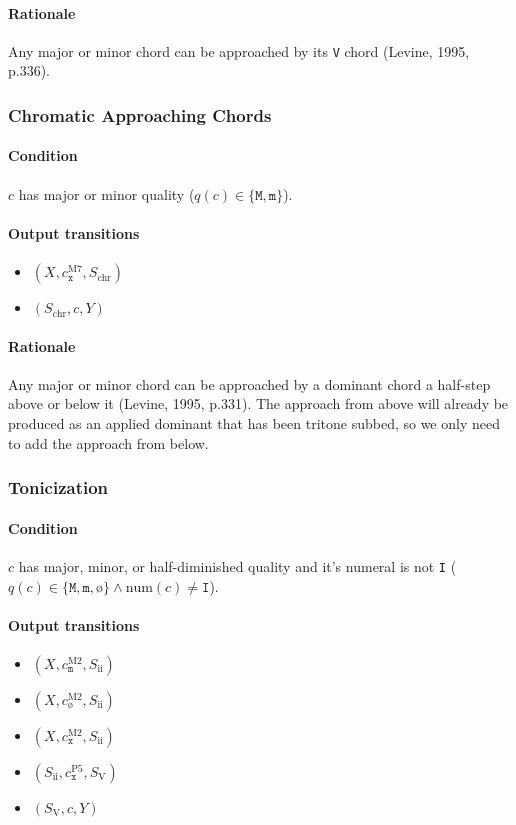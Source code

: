 \documentclass[]{article}
\begin{document}
\paragraph{Rationale} Any major or minor chord can be approached by its \texttt{V} chord (Levine, 1995, p.336).

\subsubsection{Chromatic Approaching Chords}
\paragraph{Condition} $c$ has major or minor quality ($q(c) \in \{\texttt{M}, \texttt{m}\}$).

\paragraph{Output transitions}
\begin{itemize}
	\item $(X, c_\texttt{x}^\textrm{M7}, S_\textrm{chr})$
	\item $(S_\textrm{chr}, c, Y)$
\end{itemize}

\paragraph{Rationale} Any major or minor chord can be approached by a dominant chord a half-step above or below it (Levine, 1995, p.331).  The approach from above will already be produced as an applied dominant that has been tritone subbed, so we only need to add the approach from below.

\subsubsection{Tonicization}
\paragraph{Condition} $c$ has major, minor, or half-diminished quality and it's numeral is not \texttt{I} ($q(c) \in \{\texttt{M}, \texttt{m}, \texttt{\o}\} \wedge \textrm{num}(c) \neq \texttt{I}$).

\paragraph{Output transitions}
\begin{itemize}
	\item $(X, c_\texttt{m}^\textrm{M2}, S_\textrm{ii})$
	\item $(X, c_\texttt{\o}^\textrm{M2}, S_\textrm{ii})$
	\item $(X, c_\texttt{x}^\textrm{M2}, S_\textrm{ii})$
	\item $(S_\textrm{ii}, c_\texttt{x}^\textrm{P5}, S_\textrm{V})$
	\item $(S_\textrm{V}, c, Y)$
\end{itemize}
\end{document}
